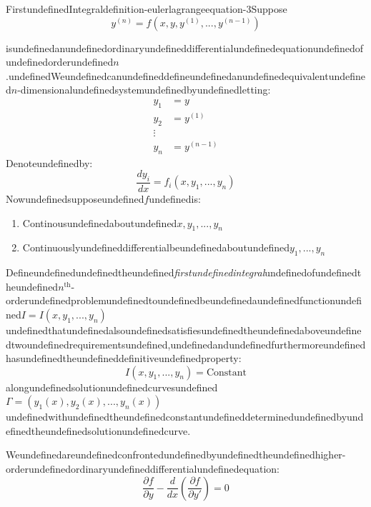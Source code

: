 \begin{mystthmdefinition}{FirstundefinedIntegral}{definition-eulerlagrangeequation-3}Suppose
\begin{equation}
y^{(n)}=f(x,y,y^{(1)},...,y^{(n-1)})
\end{equation}

isundefinedanundefinedordinaryundefineddifferentialundefinedequationundefinedofundefinedorderundefined$n$.undefinedWeundefinedcanundefineddefineundefinedanundefinedequivalentundefined$n$-dimensionalundefinedsystemundefinedbyundefinedletting:
\begin{equation}
\begin{aligned}
y_1 &= y \\
y_2 &= y^{(1)} \\
\vdots \\
y_{n} &= y^{(n-1)}
\end{aligned}
\end{equation}
Denoteundefinedby:
\begin{equation}
\frac{dy_i}{dx}=f_i(x,y_1,...,y_n)
\end{equation}
Nowundefinedsupposeundefined$f$undefinedis:

\begin{enumerate}
\item Continousundefinedaboutundefined$x,y_1,...,y_n$
\item Continuouslyundefineddifferentialbeundefinedaboutundefined$y_1,...,y_n$
\end{enumerate}

Defineundefinedundefinedtheundefined\textit{firstundefinedintegral}undefinedofundefinedtheundefined$n^{\text{th}}$-orderundefinedproblemundefinedtoundefinedbeundefinedaundefinedfunctionundefined$I=I(x,y_1,...,y_n)$undefinedthatundefinedalsoundefinedsatisfiesundefinedtheundefinedaboveundefinedtwoundefinedrequirementsundefined,undefinedandundefinedfurthermoreundefinedhasundefinedtheundefineddefinitiveundefinedproperty:
\begin{equation}
I(x,y_1,...,y_n)=\text{Constant}
\end{equation}
alongundefinedsolutionundefinedcurvesundefined$\Gamma=(y_1(x),y_2(x),...,y_n(x))$undefinedwithundefinedtheundefinedconstantundefineddeterminedundefinedbyundefinedtheundefinedsolutionundefinedcurve.

\end{mystthmdefinition}
Weundefinedareundefinedconfrontedundefinedbyundefinedtheundefinedhigher-orderundefinedordinaryundefineddifferentialundefinedequation:
\begin{equation}
\label{ele}
\frac{\partial f}{\partial y} -\frac{d}{dx}\left( \frac{\partial f}{\partial y'}\right)=0
\end{equation}

